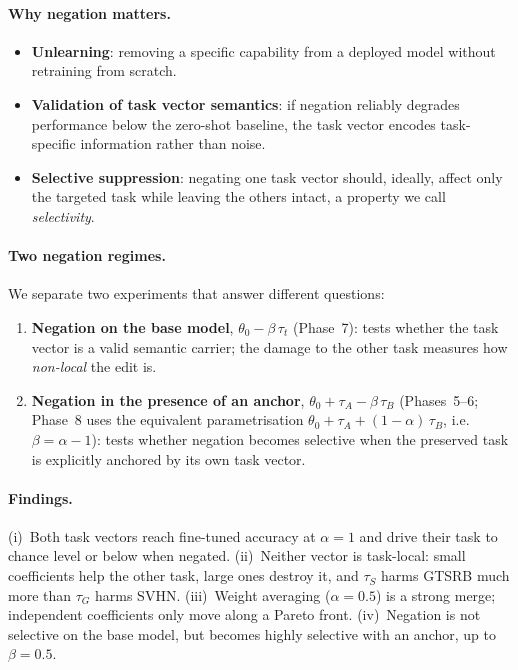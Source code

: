 \documentclass[11pt,a4paper,twocolumn]{article}
\newcommand{\tG}{\tau_G}
\newcommand{\tS}{\tau_S}
\begin{document}
\paragraph{Why negation matters.}
\begin{itemize}
  \item \textbf{Unlearning}: removing a specific capability from a deployed
  model without retraining from scratch.
  \item \textbf{Validation of task vector semantics}: if negation reliably
  degrades performance below the zero-shot baseline, the task vector
  encodes task-specific information rather than noise.
  \item \textbf{Selective suppression}: negating one task vector should,
  ideally, affect only the targeted task while leaving the others intact,
  a property we call \emph{selectivity}.
\end{itemize}

\paragraph{Two negation regimes.} We separate two experiments that answer
different questions:
\begin{enumerate}
  \item \textbf{Negation on the base model}, $\theta_0-\beta\,\tau_t$
  (Phase~7): tests whether the task vector is a valid semantic carrier;
  the damage to the other task measures how \emph{non-local} the edit is.
  \item \textbf{Negation in the presence of an anchor},
  $\theta_0+\tau_A-\beta\,\tau_B$ (Phases~5--6; Phase~8 uses the
  equivalent parametrisation $\theta_0+\tau_A+(1-\alpha)\,\tau_B$, i.e.\
  $\beta=\alpha-1$): tests whether negation becomes selective when the
  preserved task is explicitly anchored by its own task vector.
\end{enumerate}

\paragraph{Findings.} (i)~Both task vectors reach fine-tuned accuracy at
$\alpha=1$ and drive their task to chance level or below when negated.
(ii)~Neither vector is task-local: small coefficients help the other task,
large ones destroy it, and $\tS$ harms GTSRB much more than $\tG$ harms
SVHN. (iii)~Weight averaging ($\alpha=0.5$) is a strong merge; independent
coefficients only move along a Pareto front. (iv)~Negation is not
selective on the base model, but becomes highly selective with an anchor,
up to $\beta=0.5$.
\end{document}

